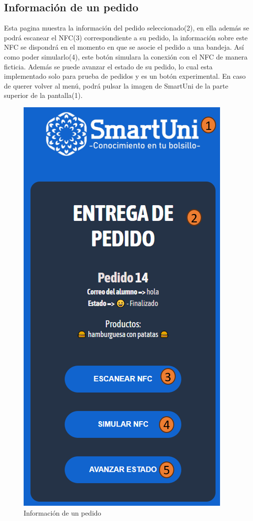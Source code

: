 \documentclass[12pt]{report}
\begin{document}
\begin{appendices}
\section{Información de un pedido}
Esta pagina muestra la información del pedido seleccionado(2), en ella además se podrá escanear el NFC(3) correspondiente a su pedido, la información sobre este NFC se dispondrá en el momento en que se asocie el pedido a una bandeja. Así como poder simularlo(4), este botón simulara la conexión con el NFC de manera ficticia. Además se puede avanzar el estado de su pedido, lo cual esta implementado solo para prueba de pedidos y es un botón experimental. En caso de querer volver al menú, podrá pulsar la imagen de SmartUni de la parte superior de la pantalla(1).
\\
\begin{figure}[H]
    \centering
    \includegraphics[scale = 0.7]{imagenes//manual_de_usuario/11.png}
    \caption{Información de un pedido}
    \label{fig:enter-label}
\end{figure}
\newpage

\end{appendices}
\end{document}
